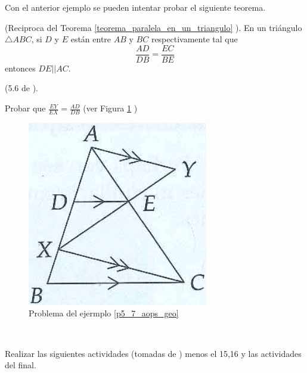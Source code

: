 Con el anterior ejemplo se pueden intentar probar el siguiente teorema.

\begin{theorem}
	(Reciproca del Teorema \ref{teorema_paralela_en_un_triangulo} ). En un triángulo $\triangle ABC$, si $D$ y $E$ están entre $AB$ y $BC$ respectivamente tal que
	\begin{equation*}
	\frac{AD}{DB}=\frac{EC}{BE}
	\end{equation*}	 	
	entonces $DE||AC$. 
\end{theorem}


\begin{ejemplo}{(5.6 de \cite{Aops_Geometria}). \\}
	\item \label{p5_7_aops_geo} Probar que $\frac{EY}{EX} = \frac{AD}{DB}$ (ver Figura \ref{aops_geo_p5_7} )
	\begin{figure}[H]
		\centering
		\includegraphics[width=0.25\linewidth]{Geometria/imgs/aops_geo_p5_7}
		\caption{Problema del ejermplo \ref{p5_7_aops_geo}}
		\label{aops_geo_p5_7}
	\end{figure}
	
\end{ejemplo}

\begin{exer}{\ \\}
	\item Realizar las siguientes actividades (tomadas de \cite{clemens}) menos el 15,16 y las actividades del final.
	
		\setlength{\voffset}{0cm}
		\setlength{\hoffset}{-1cm}
		
		
		
		\setlength{\voffset}{0cm}
		\setlength{\hoffset}{-1cm}
		
		
		
		\setlength{\voffset}{0cm}
		\setlength{\hoffset}{-1cm}
		
		

\end{exer}


